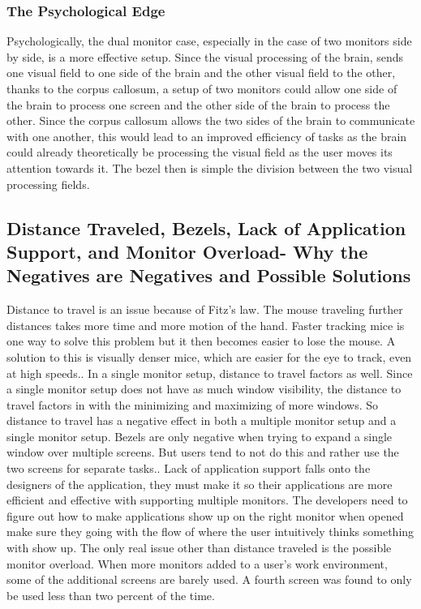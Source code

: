 \documentclass[a4paper]{article}
\begin{document}
\subsubsection{The Psychological Edge}
Psychologically, the dual monitor case, especially in the case of two monitors side by side, is a more effective setup. Since the visual processing of the brain, sends one visual field to one side of the brain and the other visual field to the other, thanks to the corpus callosum, a setup of two monitors could allow one side of the brain to process one screen and the other side of the brain to process the other. Since the corpus callosum allows the two sides of the brain to communicate with one another, this would lead to an improved efficiency of tasks as the brain could already theoretically be processing the visual field as the user moves its attention towards it. The bezel then is simple the division between the two visual processing fields.

\subsection{Distance Traveled, Bezels, Lack of Application Support, and Monitor Overload- Why the Negatives are Negatives and Possible Solutions}
Distance to travel is an issue because of Fitz's law. The mouse traveling further distances takes more time and more motion of the hand. Faster tracking mice is one way to solve this problem but it then becomes easier to lose the mouse. A solution to this is visually denser mice, which are easier for the eye to track, even at high speeds.\cite{Truemper}. In a single monitor setup, distance to travel factors as well. Since a single monitor setup does not have as much window visibility, the distance to travel factors in with the minimizing and maximizing of more windows. So distance to travel has a negative effect in both a multiple monitor setup and a single monitor setup. Bezels are only negative when trying to expand a single window over multiple screens. But users tend to not do this and rather use the two screens for separate tasks.\cite{Grudin}. Lack of application support falls onto the designers of the application, they must make it so their applications are more efficient and effective with supporting multiple monitors. The developers need to figure out how to make applications show up on the right monitor when opened make sure they going with the flow of where the user intuitively thinks something with show up.\cite{Grudin} The only real issue other than distance traveled is the possible monitor overload. When more monitors added to a user's work environment, some of the additional screens are barely used. A fourth screen was found to only be used less than two percent of the time.\cite{Truemper}
\end{document}
